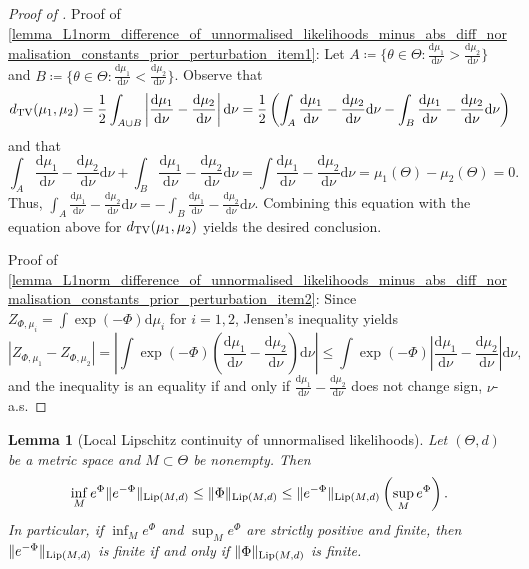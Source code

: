 \documentclass[a4paper]{scrartcl}
\newtheorem{lemma}[theorem]{Lemma}
\theoremstyle{definition}
\numberwithin{equation}{section}
\newcommand{\rd}{\mathrm{d}}
\newcommand{\Abs}[1]{\left\vert#1\right\vert}
\newcommand{\norm}[1]{\Vert #1 \Vert}
\newcommand{\Lip}[0]{\textup{Lip}}
\newcommand{\TV}[0]{\textup{TV}}
\begin{document}
 \begin{proof}[Proof of ]
 Proof of \cref{lemma_L1norm_difference_of_unnormalised_likelihoods_minus_abs_diff_normalisation_constants_prior_perturbation_item1}:
 Let $A\coloneqq \{\theta\in\Theta:\tfrac{\rd\mu_1}{\rd\nu}> \tfrac{\rd\mu_2}{\rd\nu}\}$ and $B\coloneqq \{\theta\in\Theta:\tfrac{\rd\mu_1}{\rd\nu}<\tfrac{\rd\mu_2}{\rd\nu}\}$.
 Observe that
\begin{equation*}
 d_{\TV}(\mu_1,\mu_2)=\frac{1}{2}\int_{A\cup B} \Abs{\frac{\rd\mu_1}{\rd\nu}-\frac{\rd\mu_2}{\rd\nu}  }\rd \nu=\frac{1}{2}\left(\int_A \frac{\rd\mu_1}{\rd\nu}-\frac{\rd\mu_2}{\rd\nu} \rd \nu-\int_B \frac{\rd\mu_1}{\rd\nu}-\frac{\rd\mu_2}{\rd\nu} \rd \nu\right)
\end{equation*}
and that
\begin{equation*}
 \int_A \frac{\rd\mu_1}{\rd\nu}-\frac{\rd\mu_2}{\rd\nu} \rd \nu+\int_B \frac{\rd\mu_1}{\rd\nu}-\frac{\rd\mu_2}{\rd\nu} \rd \nu=\int\frac{\rd\mu_1}{\rd\nu}-\frac{\rd\mu_2}{\rd\nu} \rd \nu=\mu_1(\Theta)-\mu_2(\Theta)=0.
\end{equation*}
Thus, $\int_A \frac{\rd\mu_1}{\rd\nu}-\frac{\rd\mu_2}{\rd\nu} \rd \nu=-\int_B \frac{\rd\mu_1}{\rd\nu}-\frac{\rd\mu_2}{\rd\nu} \rd \nu$.
Combining this equation with the equation above for $d_{\TV}(\mu_1,\mu_2)$ yields the desired conclusion.

Proof of \cref{lemma_L1norm_difference_of_unnormalised_likelihoods_minus_abs_diff_normalisation_constants_prior_perturbation_item2}: Since $Z_{\Phi,\mu_i}=\int \exp(-\Phi) \rd \mu_i$ for $i=1,2$, Jensen's inequality yields
\begin{equation*}
 \Abs{Z_{\Phi,\mu_1}-Z_{\Phi,\mu_2}}=\Abs{\int \exp(-\Phi)\left(\frac{\rd\mu_1}{\rd\nu}-\frac{\rd\mu_2}{\rd\nu}\right)\rd \nu}\leq \int \exp(-\Phi)\Abs{\frac{\rd\mu_1}{\rd\nu}-\frac{\rd\mu_2}{\rd\nu}}\rd \nu,
\end{equation*}
and the inequality is an equality if and only if $\tfrac{\rd\mu_1}{\rd\nu}-\tfrac{\rd\mu_2}{\rd\nu}$ does not change sign, $\nu$-a.s.
 \end{proof}
\begin{lemma}[Local Lipschitz continuity of unnormalised likelihoods]
 \label{lemma_local_Lipschitz_continuity_unnormalised_likelihoods}
 Let $(\Theta,d)$ be a metric space and $M\subset \Theta$ be nonempty.
 Then
 \begin{equation*}
\inf_{M}e^{\Phi}\norm{e^{-\Phi}}_{\Lip(M,d)}\leq \norm{\Phi}_{\Lip(M,d)}\leq \norm{e^{-\Phi}}_{\Lip(M,d)} \left(\sup_{M}e^{\Phi}\right).
 \end{equation*}
In particular, if $\inf_M e^{\Phi}$ and $\sup_M e^{\Phi}$ are strictly positive and finite, then $\norm{e^{-\Phi}}_{\Lip(M,d)}$ is finite if and only if $\norm{\Phi}_{\Lip(M,d)}$ is finite.
\end{lemma}
\end{document}
